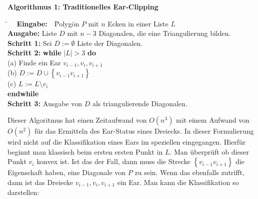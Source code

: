 \begin{flushleft}
  { \textbf{Algorithmus 1: Traditionelles Ear-Clipping} \cite{improvedeca}
        \begin{tabbing}
          \=$~~~~~~$\= \textbf{Eingabe:} $~~~$\= Polyg\=on $P$ mit $n$ Ecken in einer Liste $L$\\
          \> \> \textbf{Ausgabe:} \> Liste $D$ mit $n-3$ Diagonalen, die eine Triangulierung bilden.\\
          \> \> \textbf{Schritt 1:} \>Sei $D := \emptyset$ Liste der Diagonalen.\\
          \> \> \textbf{Schritt 2:} \>\textbf{while} $|L| > 3$ \textbf{do}\\
          \> \>                     \> \> (a) Finde ein Ear $v_{i-1}, v_i, v_{i+1}$\\
          \> \>                     \> \> (b) $D := D \cup \left\{v_{i-1} v_{i+1}\right\}$\\
          \> \>                     \> \> (c) $L := L\setminus v_i$\\
          \> \> \> \textbf{endwhile}\\
          \> \> \textbf{Schritt 3:} \> Ausgabe von $D$ als triangulierende Diagonalen.
        \end{tabbing}
}
\end{flushleft}

Dieser Algoritmus hat einen Zeitaufwand von $O(n^3)$ mit einem Aufwand von $O(n^2)$ für das Ermitteln des Ear-Status eines Dreiecks. 
In dieser Formulierung wird nicht auf die Klassifikation eines Ears im speziellen eingegangen. Hierfür beginnt man klassisch 
beim ersten ersten Punkt in $L$. Man überprüft ob dieser Punkt $v_i$ konvex ist. Ist das der Fall, dann muss die Strecke $\left\{v_{i-1}v_{i+1}\right\}$ die Eigenschaft haben, 
eine Diagonale von $P$ zu sein. Wenn das ebenfalls zutrifft, dann ist das Dreiecke $v_{i-1}, v_i, v_{i+1}$ ein Ear. 
Man kann die Klassifikation so darstellen:

